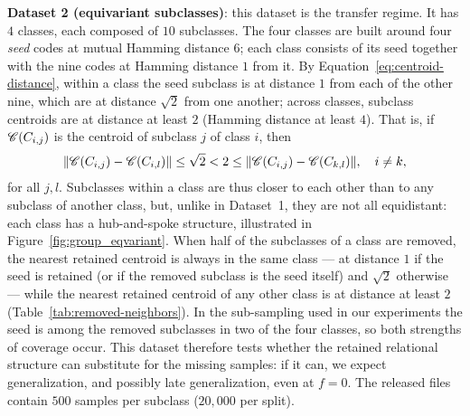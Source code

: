 ﻿\documentclass[../ppgc-tese.tex]{subfiles}
\begin{document}
\noindent \textbf{Dataset 2 (equivariant subclasses)}\label{sec:similar-dataset}: this dataset is the transfer regime. It has $4$ classes, each composed of $10$ subclasses. The four classes are built around four \emph{seed} codes at mutual Hamming distance $6$; each class consists of its seed together with the nine codes at Hamming distance $1$ from it. By Equation~\ref{eq:centroid-distance}, within a class the seed subclass is at distance $1$ from each of the other nine, which are at distance $\sqrt{2}$ from one another; across classes, subclass centroids are at distance at least $2$ (Hamming distance at least $4$). That is, if $\mathscr{C}({C_{i,j}})$ is the centroid of subclass $j$ of class $i$, then
\[
\|\mathscr{C}({C_{i,j}}) - \mathscr{C}({C_{i,l}})\| \leq \sqrt{2} < 2 \leq \|\mathscr{C}({C_{i,j}}) - \mathscr{C}({C_{k,l}})\|
, \quad i \neq k,
\]
for all $j, l$. Subclasses within a class are thus closer to each other than to any subclass of another class, but, unlike in Dataset~1, they are not all equidistant: each class has a hub-and-spoke structure, illustrated in Figure~\ref{fig:group_eqvariant}. When half of the subclasses of a class are removed, the nearest retained centroid is always in the same class --- at distance $1$ if the seed is retained (or if the removed subclass is the seed itself) and $\sqrt{2}$ otherwise --- while the nearest retained centroid of any other class is at distance at least $2$ (Table~\ref{tab:removed-neighbors}). In the sub-sampling used in our experiments the seed is among the removed subclasses in two of the four classes, so both strengths of coverage occur. This dataset therefore tests whether the retained relational structure can substitute for the missing samples: if it can, we expect generalization, and possibly late generalization, even at $f = 0$. The released files contain $500$ samples per subclass ($20{,}000$ per split).
\end{document}
